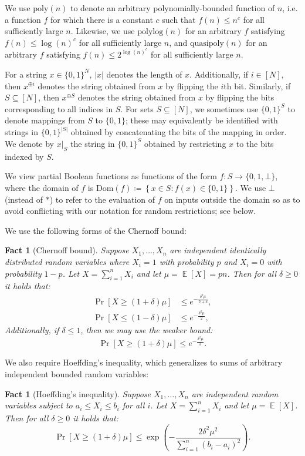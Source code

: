 \documentclass[10pt,a4paper]{article}
\newtheorem{fact}[theorem]{Fact}
\newcommand{\E}{\mathop{\mathbb{E}}}
\newcommand{\poly}{\mathrm{poly}}
\newcommand{\polylog}{\mathrm{polylog}}
\newcommand{\quasipoly}{\mathrm{quasipoly}}
\newcommand{\Dom}{\mathrm{Dom}}
\begin{document}
We use $\poly(n)$ to denote an arbitrary polynomially-bounded function of $n$, i.e. a function $f$ for which there is a constant $c$ such that $f(n) \le n^c$ for all sufficiently large $n$. Likewise, we use $\polylog(n)$ for an arbitrary $f$ satisfying $f(n) \le \log(n)^c$ for all sufficiently large $n$, and $\quasipoly(n)$ for an arbitrary $f$ satisfying $f(n) \le 2^{\log(n)^c}$ for all sufficiently large $n$.

For a string $x \in \{0,1\}^N$, $|x|$ denotes the length of $x$. Additionally, if $i \in [N]$, then $x^{\oplus i}$ denotes the string obtained from $x$ by flipping the $i$th bit. Similarly, if $S \subseteq [N]$, then $x^{\oplus S}$ denotes the string obtained from $x$ by flipping the bits corresponding to all indices in $S$. For sets $S \subseteq [N]$, we sometimes use $\{0,1\}^S$ to denote mappings from $S$ to $\{0,1\}$; these may equivalently be identified with strings in $\{0,1\}^{|S|}$ obtained by concatenating the bits of the mapping in order. We denote by $x|_S$ the string in $\{0,1\}^S$ obtained by restricting $x$ to the bits indexed by $S$.

We view partial Boolean functions as functions of the form $f: S \to \{0,1,\bot\}$, where the domain of $f$ is $\Dom(f) \coloneqq \left\{ x \in S : f(x) \in \{0,1\} \right\}$. We use $\bot$ (instead of $*$) to refer to the evaluation of $f$ on inputs outside the domain so as to avoid conflicting with our notation for random restrictions; see  below.

We use the following forms of the Chernoff bound:

\begin{fact}[Chernoff bound]
\label{fact:chernoff}
Suppose $X_1,\ldots,X_n$ are independent identically distributed random variables where $X_i = 1$ with probability $p$ and $X_i = 0$ with probability $1-p$. Let $X = \sum_{i=1}^n X_i$ and let $\mu = \E[X] = pn$. Then for all $\delta \ge 0$ it holds that:
\begin{align*}
\Pr\left[X \ge (1 + \delta)\mu\right] &\le e^{-\frac{\delta^2\mu}{2+\delta}},\\
\Pr\left[X \le (1 - \delta)\mu\right] &\le e^{-\frac{\delta^2\mu}{2}},
\end{align*}
Additionally, if $\delta \le 1$, then we may use the weaker bound:
\[
\Pr\left[X \ge (1 + \delta)\mu\right] \le e^{-\frac{\delta^2\mu}{3}}.
\]
\end{fact}

We also require Hoeffding's inequality, which generalizes  to sums of arbitrary independent bounded random variables:
\begin{fact}[Hoeffding's inequality]
\label{fact:hoeffding}
Suppose $X_1,\ldots,X_n$ are independent random variables subject to $a_i \le X_i \le b_i$ for all $i$. Let $X = \sum_{i=1}^n X_i$ and let $\mu = \E[X]$. Then for all $\delta \ge 0$ it holds that:
\[
\Pr\left[X \ge (1 + \delta)\mu\right] \le \exp\left(-\frac{2\delta^2\mu^2}{ \sum_{i=1}^n (b_i - a_i)^2}\right).
\]

\end{fact}
\end{document}
